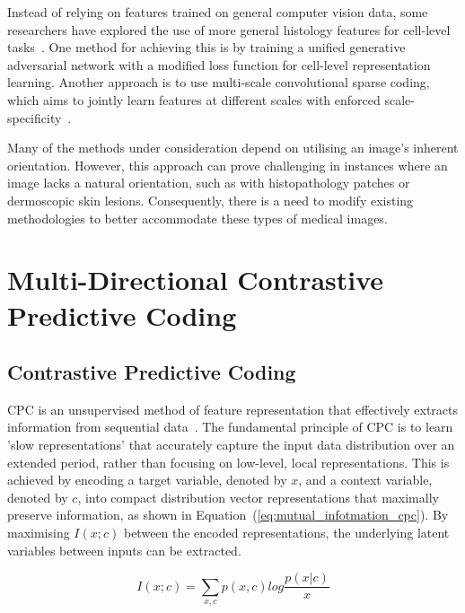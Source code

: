 Instead of relying on features trained on general computer vision data, some researchers have explored the use of more general histology features for cell-level tasks~\citep{hu2018unsupervised}. One method for achieving this is by training a unified generative adversarial network with a modified loss function for cell-level representation learning. Another approach is to use multi-scale convolutional sparse coding, which aims to jointly learn features at different scales with enforced scale-specificity~\citep{chang2017unsupervised}.

Many of the methods under consideration depend on utilising an image’s inherent orientation. However, this approach can prove challenging in instances where an image lacks a natural orientation, such as with histopathology patches or dermoscopic skin lesions. Consequently, there is a need to modify existing methodologies to better accommodate these types of medical images.



\section{Multi-Directional Contrastive Predictive Coding}
\label{sec:unsupervised_multi_directional_cpc}
\subsection{Contrastive Predictive Coding}
\label{subsec:unsupervised_cpc}
CPC is an unsupervised method of feature representation that effectively extracts information from sequential data~\citep{oord2018representation}. The fundamental principle of CPC is to learn 'slow representations' that accurately capture the input data distribution over an extended period, rather than focusing on low-level, local representations. This is achieved by encoding a target variable, denoted by $x$, and a context variable, denoted by $c$, into compact distribution vector representations that maximally preserve information, as shown in Equation~(\ref{eq:mutual_infotmation_cpc}). By maximising $I(x;c)$ between the encoded representations, the underlying latent variables between inputs can be extracted.

\begin{equation}
	I(x;c) = \sum_{x, c}p(x, c) log \frac{p(x|c)}{x}
	\label{eq:mutual_infotmation_cpc}
\end{equation}


